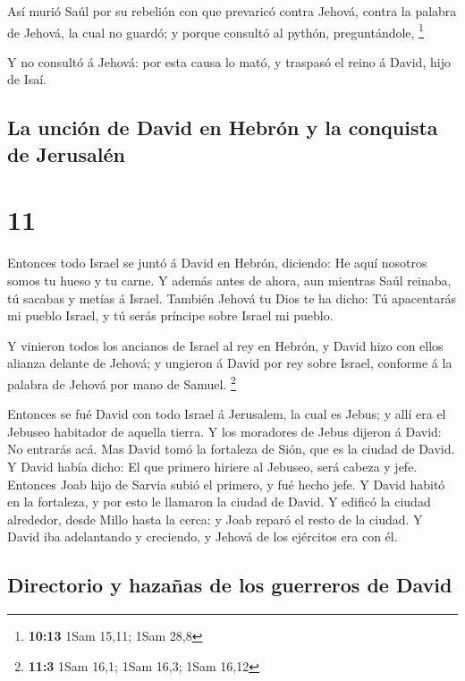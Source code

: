  Así murió Saúl por su rebelión con que prevaricó contra
Jehová, contra la palabra de Jehová, la cual no guardó; y porque
consultó al pythón, preguntándole, \footnote{\textbf{10:13} 1Sam 15,11;
  1Sam 28,8}

 Y no consultó á Jehová: por esta causa lo mató, y traspasó
el reino á David, hijo de Isaí.

\hypertarget{la-unciuxf3n-de-david-en-hebruxf3n-y-la-conquista-de-jerusaluxe9n}{%
\subsection{La unción de David en Hebrón y la conquista de
Jerusalén}\label{la-unciuxf3n-de-david-en-hebruxf3n-y-la-conquista-de-jerusaluxe9n}}

\hypertarget{section-10}{%
\section{11}\label{section-10}}

 Entonces todo Israel se juntó á David en Hebrón, diciendo:
He aquí nosotros somos tu hueso y tu carne.  Y además antes
de ahora, aun mientras Saúl reinaba, tú sacabas y metías á Israel.
También Jehová tu Dios te ha dicho: Tú apacentarás mi pueblo Israel, y
tú serás príncipe sobre Israel mi pueblo.

 Y vinieron todos los ancianos de Israel al rey en Hebrón, y
David hizo con ellos alianza delante de Jehová; y ungieron á David por
rey sobre Israel, conforme á la palabra de Jehová por mano de Samuel.
\footnote{\textbf{11:3} 1Sam 16,1; 1Sam 16,3; 1Sam 16,12}

 Entonces se fué David con todo Israel á Jerusalem, la cual
es Jebus; y allí era el Jebuseo habitador de aquella tierra.
 Y los moradores de Jebus dijeron á David: No entrarás acá.
Mas David tomó la fortaleza de Sión, que es la ciudad de David.
 Y David había dicho: El que primero hiriere al Jebuseo,
será cabeza y jefe. Entonces Joab hijo de Sarvia subió el primero, y fué
hecho jefe.  Y David habitó en la fortaleza, y por esto le
llamaron la ciudad de David.  Y edificó la ciudad alrededor,
desde Millo hasta la cerca: y Joab reparó el resto de la ciudad.
 Y David iba adelantando y creciendo, y Jehová de los
ejércitos era con él.

\hypertarget{directorio-y-hazauxf1as-de-los-guerreros-de-david}{%
\subsection{Directorio y hazañas de los guerreros de
David}\label{directorio-y-hazauxf1as-de-los-guerreros-de-david}}

